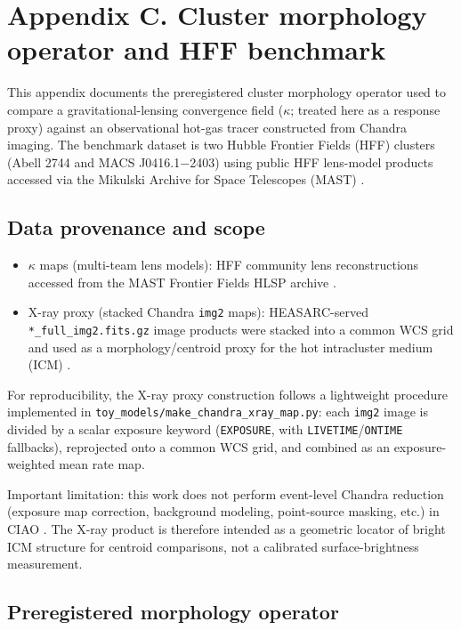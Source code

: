 \section{Appendix C. Cluster morphology operator and HFF benchmark}

This appendix documents the preregistered cluster morphology operator used to compare a gravitational-lensing convergence field ($\kappa$; treated here as a response proxy) against an observational hot-gas tracer constructed from Chandra imaging. The benchmark dataset is two Hubble Frontier Fields (HFF) clusters (Abell 2744 and MACS J0416.1$-$2403) using public HFF lens-model products accessed via the Mikulski Archive for Space Telescopes (MAST) \citep{MAST2019}.

\subsection{Data provenance and scope}

\begin{itemize}
	\item $\kappa$ maps (multi-team lens models): HFF community lens reconstructions accessed from the MAST Frontier Fields HLSP archive \citep{MAST2019}.
	\item X-ray proxy (stacked Chandra \texttt{img2} maps): HEASARC-served \texttt{*\_full\_img2.fits.gz} image products were stacked into a common WCS grid and used as a morphology/centroid proxy for the hot intracluster medium (ICM) \citep{HEASARC2025,Weisskopf2002}.
\end{itemize}

For reproducibility, the X-ray proxy construction follows a lightweight procedure implemented in \texttt{toy\_models/make\_chandra\_xray\_map.py}: each \texttt{img2} image is divided by a scalar exposure keyword (\texttt{EXPOSURE}, with \texttt{LIVETIME}/\texttt{ONTIME} fallbacks), reprojected onto a common WCS grid, and combined as an exposure-weighted mean rate map.

Important limitation: this work does not perform event-level Chandra reduction (exposure map correction, background modeling, point-source masking, etc.) in CIAO \citep{Fruscione2006}. The X-ray product is therefore intended as a geometric locator of bright ICM structure for centroid comparisons, not a calibrated surface-brightness measurement.

\subsection{Preregistered morphology operator}

